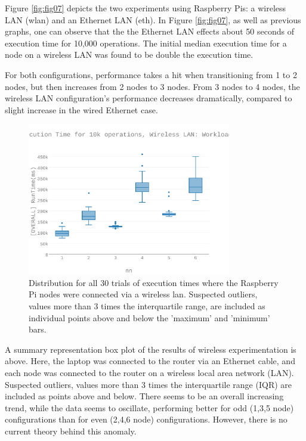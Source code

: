 Figure \ref{fig:fig07} depicts the two experiments using Raspberry Pis: a wireless LAN (wlan) and an Ethernet LAN (eth).  In Figure \ref{fig:fig07}, as well as previous graphs, one can observe that the the Ethernet LAN effects about 50 seconds of execution time for 10,000 operations.  The initial median execution time for a node on a wireless LAN was found to be double the execution time.

For both configurations, performance takes a hit when transitioning from 1 to 2 nodes, but then increases from 2 nodes to 3 nodes.  From 3 nodes to 4 nodes, the wireless LAN configuration’s performance decreases dramatically, compared to slight increase in the wired Ethernet case.  

\begin{figure}[h]
\includegraphics[width=3.5in]{Figures/figures-wle_fig8.pdf}

\caption{Distribution for all 30 trials of execution times where the Raspberry Pi nodes were connected via a wireless \gls{lan}.  Suspected outliers, values more than 3 times the interquartile range, are included as individual points above and below the 'maximum' and 'minimum' bars.}

\label{fig:fig08}
\end{figure}

A summary representation box plot of the results of wireless experimentation is above.  Here, the laptop was connected to the router via an Ethernet cable, and each node was connected to the router on a wireless local area network (LAN).  Suspected outliers, values more than 3 times the interquartile range (IQR) are included as points above and below.
There seems to be an overall increasing trend, while the data seems to oscillate, performing better for odd (1,3,5 node) configurations than for even (2,4,6 node) configurations.  However, there is no current theory behind this anomaly. 

